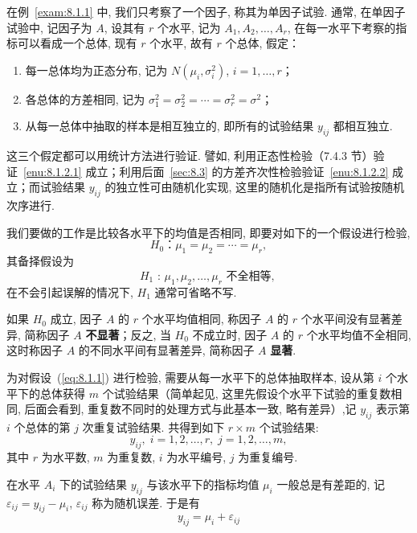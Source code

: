 在例~\ref{exam:8.1.1} 中, 我们只考察了一个因子, 称其为单因子试验. 通常, 在单因子试验中, 记因子为 $A$, 设其有 $r$ 个水平, 记为 $A_1,A_2,\ldots,A_r$, 在每一水平下考察的指标可以看成一个总体, 现有 $r$ 个水平, 故有 $r$ 个总体, 假定：

\begin{enumerate}
  \item 每一总体均为正态分布, 记为 $N(\mu_i, \sigma_i^2)$, $i=1,\ldots,r$；\label{enu:8.1.2.1}
  \item 各总体的方差相同, 记为 $\sigma_1^2 = \sigma_2^2=\cdots=\sigma_r^2=\sigma^2$；\label{enu:8.1.2.2}
  \item 从每一总体中抽取的样本是相互独立的, 即所有的试验结果 $y_{ij}$ 都相互独立. 
\end{enumerate}

这三个假定都可以用统计方法进行验证. 譬如, 利用正态性检验（7.4.3 节）验证~\ref{enu:8.1.2.1} 成立；利用后面~\ref{sec:8.3} 的方差齐次性检验验证~\ref{enu:8.1.2.2} 成立；而试验结果 $y_{ij}$ 的独立性可由随机化实现, 这里的随机化是指所有试验按随机次序进行. 

我们要做的工作是比较各水平下的均值是否相同, 即要对如下的一个假设进行检验, 
\begin{equation}
  H_0 \text{：} \mu_1 = \mu_2 = \cdots = \mu_r,\label{eq:8.1.1}
\end{equation}
其备择假设为
\begin{equation*}
  H_1 \text{ : } \mu_1,\mu_2,\ldots,\mu_r \text{ 不全相等, }
\end{equation*}
在不会引起误解的情况下, $H_1$ 通常可省略不写. 

如果 $H_0$ 成立, 因子 $A$ 的 $r$ 个水平均值相同, 称因子 $A$ 的 $r$ 个水平间没有显著差异, 简称因子 $A$ \textbf{不显著}；反之, 当 $H_0$ 不成立时, 因子 $A$ 的 $r$ 个水平均值不全相同, 这时称因子 $A$ 的不同水平间有显著差异, 简称因子 $A$ \textbf{显著}. 

为对假设~(\ref{eq:8.1.1}) 进行检验, 需要从每一水平下的总体抽取样本, 设从第 $i$ 个水平下的总体获得 $m$ 个试验结果（简单起见, 这里先假设个水平下试验的重复数相同, 后面会看到, 重复数不同时的处理方式与此基本一致, 略有差异）,记 $y_{ij}$ 表示第 $i$ 个总体的第 $j$ 次重复试验结果. 共得到如下 $r \times m$ 个试验结果:
\begin{equation*}
  y_{ij}, \; i=1,2,\ldots,r, \; j = 1,2,\ldots,m,
\end{equation*}
其中 $r$ 为水平数, $m$ 为重复数, $i$ 为水平编号, $j$ 为重复编号.

在水平 $A_i$ 下的试验结果 $y_{ij}$ 与该水平下的指标均值 $\mu_i$ 一般总是有差距的, 记 $\varepsilon_{ij} = y_{ij} - \mu_i$, $\varepsilon_{ij}$ 称为随机误差. 于是有
\begin{equation}
  \label{eq:8.1.2}
  y_{ij} = \mu_i + \varepsilon_{ij}
\end{equation}

